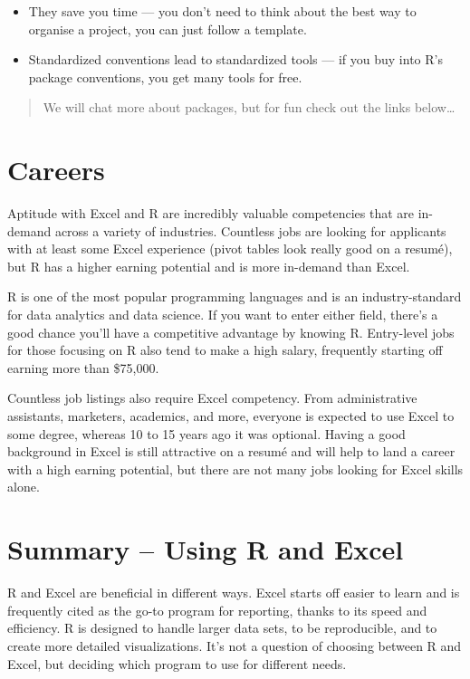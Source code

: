 \documentclass[
]{book}
\providecommand{\tightlist}{%
  \setlength{\itemsep}{0pt}\setlength{\parskip}{0pt}}
\begin{document}
\begin{itemize}
\tightlist
\item
  They save you time --- you don't need to think about the best way to organise a project, you can just follow a template.
\item
  Standardized conventions lead to standardized tools --- if you buy into R's package conventions, you get many tools for free.
\end{itemize}

\begin{quote}
We will chat more about packages, but for fun check out the links below\ldots{}
\end{quote}

\hypertarget{careers}{%
\section{Careers}\label{careers}}

Aptitude with Excel and R are incredibly valuable competencies that are in-demand across a variety of industries. Countless jobs are looking for applicants with at least some Excel experience (pivot tables look really good on a resumé), but R has a higher earning potential and is more in-demand than Excel.

R is one of the most popular programming languages and is an industry-standard for data analytics and data science. If you want to enter either field, there's a good chance you'll have a competitive advantage by knowing R. Entry-level jobs for those focusing on R also tend to make a high salary, frequently starting off earning more than \$75,000.

Countless job listings also require Excel competency. From administrative assistants, marketers, academics, and more, everyone is expected to use Excel to some degree, whereas 10 to 15 years ago it was optional. Having a good background in Excel is still attractive on a resumé and will help to land a career with a high earning potential, but there are not many jobs looking for Excel skills alone.

\hypertarget{summary-using-r-and-excel}{%
\section{Summary -- Using R and Excel}\label{summary-using-r-and-excel}}

R and Excel are beneficial in different ways. Excel starts off easier to learn and is frequently cited as the go-to program for reporting, thanks to its speed and efficiency. R is designed to handle larger data sets, to be reproducible, and to create more detailed visualizations. It's not a question of choosing between R and Excel, but deciding which program to use for different needs.
\end{document}

